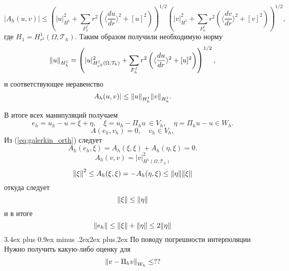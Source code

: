\documentclass[a4paper,12pt, russian, titlepage]{article} %
\makeatletter
\numberwithin{equation}{section}
\renewcommand{\subsection}{\@startsection{subsection}{2}{1cm}%
{3.4ex plus 0.9ex minus .2ex}{2ex plus.2ex}%
{\normalfont\large\bfseries}}
\numberwithin{theorem}{subsection}
\numberwithin{definition}{subsection}
\numberwithin{proposition}{subsection}
\makeatother
\begin{document}
\begin{equation}
|A_h(u, v)| \le \left( |u|^2_{H^1} +  \sum_{F^I_h} r^2 \left( \langle \frac{du}{dr}\rangle^2 + [u]^2 \right) \right)^{1/2}  \left(|v|^2_{H^1} + \sum_{F^I_h} r^2 \left( \langle \frac{dv}{dr}\rangle^2 + [v]^2 \right) \right)^{1/2},
\end{equation}
 где $H_1 = H^1_{r^2}(\Omega, \mathcal{T}_h)$.
Таким образом получили необходимую норму
\begin{equation}
\norm{u}_{H^1_h} = \left( |u|^2_{H^1_{r^2}(\Omega, \mathcal{T}_h)} +  \sum_{F^I_h} r^2 \left( \langle \frac{du}{dr}\rangle^2 + [u]^2 \right) \right)^{1/2},
\end{equation}
и соответствующее неравенство
\begin{equation}
A_h(u, v)| \le \norm{u}_{H^1_h} \norm{v}_{H^1_h}.
\end{equation}\par

 
В итоге всех манипуляций получаем
\begin{equation}
e_h = u_h - u = \xi + \eta, \quad \xi = u_h - \Pi_h u \ \in V_h, \quad \eta = \Pi_h u - u \in W_h.
\end{equation}
\begin{equation}\label{eq:galerkin_orth}
A(e_h, v_h) = 0, \quad v_h \in V_h,
\end{equation}
Из (\ref{eq:galerkin_orth}) следует
\begin{equation}
A_h(e_h, \xi) = A_h(\xi, \xi) + A_h(\eta, \xi) = 0.
\end{equation}
\begin{equation}
A_h(v, v) = |v|_{H^1(\Omega, \mathcal{T}_h)}^2
\end{equation}
\begin{equation}
\norm{\xi}^2 \le A_h(\xi, \xi) = -A_h(\eta, \xi) \le \norm{\eta} \norm{\xi}
\end{equation}
откуда  следует
\begin{equation}
\norm{\xi} \le \norm{\eta}
\end{equation}
и в итоге
\begin{equation}
\norm{e_h} \le \norm{\xi} + \norm{\eta} \le 2\norm{\eta}
\end{equation}
\subsection{По поводу погрешности интерполяции}
Нужно получить какую-либо оценку для 
\begin{equation}
\norm{v - \Pi_h v}_{W_h} \le ??
\end{equation}
\end{document}

